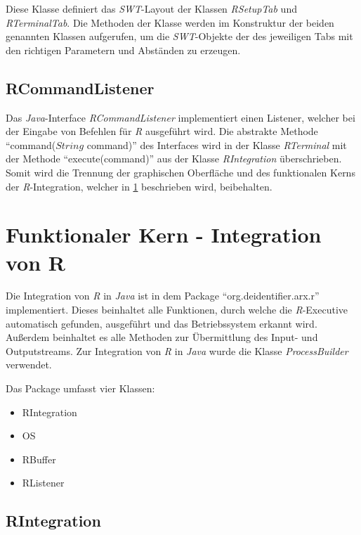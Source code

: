 \documentclass[a4paper, 12pt]{report} %
\begin{document}
Diese Klasse definiert das \textit{SWT}-Layout der Klassen \textit{RSetupTab} und \textit{RTerminalTab}. 
Die Methoden der Klasse werden im Konstruktur der beiden genannten Klassen aufgerufen, um die \textit{SWT}-Objekte der des jeweiligen Tabs mit den richtigen Parametern und Abständen zu erzeugen.

\subsection{RCommandListener} \label{RCommandListener}

Das \textit{Java}-Interface \textit{RCommandListener} implementiert einen Listener, welcher bei der Eingabe von Befehlen für \textit{R} ausgeführt wird. Die abstrakte Methode "`command($String$ command)"' des Interfaces wird in der Klasse \textit{RTerminal} mit der Methode "`execute(command)"' aus der Klasse \textit{RIntegration} überschrieben. Somit wird die Trennung der graphischen Oberfläche und des funktionalen Kerns der \textit{R}-Integration, welcher in \ref{funktionaler Kern} beschrieben wird, beibehalten.


\section{Funktionaler Kern - Integration von R} \label{funktionaler Kern}

Die Integration von \textit{R} in \textit{Java} ist in dem Package "`org.deidentifier.arx.r"' implementiert. Dieses beinhaltet alle Funktionen, durch welche die \textit{R}-Executive automatisch gefunden, ausgeführt und das Betriebssystem erkannt wird. Außerdem beinhaltet es alle Methoden zur Übermittlung des Input- und Outputstreams.
Zur Integration von \textit{R} in \textit{Java} wurde die Klasse \textit{ProcessBuilder} \cite{processBuilder} verwendet.

\begin{samepage}
Das Package umfasst vier Klassen:
\begin{itemize}
	\item RIntegration
	\item OS
	\item RBuffer
	\item RListener
\end{itemize}
\end{samepage}


\subsection{RIntegration} \label{RIntegration}
\end{document}
